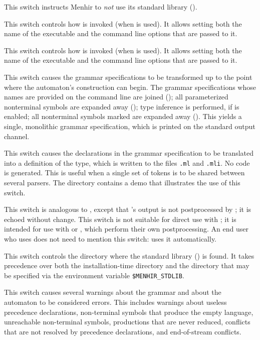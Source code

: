 \documentclass[onecolumn,11pt,nocopyrightspace,preprint]{sigplanconf}
\begin{document}
\docswitch{\onostdlib} This switch instructs Menhir to \emph{not} use
its standard library ().

 This switch controls how \ocamlc is
invoked (when \oinfer is used). It allows setting both the name of
the executable and the command line options that are passed to it.

 This switch controls how \ocamldep is
invoked (when \odepend is used). It allows setting both the name of the
executable and the command line options that are passed to it.

\docswitch{\oonlypreprocess} This switch causes the grammar specifications
to be transformed up to the point where the automaton's construction can
begin. The grammar specifications whose names are provided on the command line
are joined (); all parameterized nonterminal symbols are
expanded away (); type inference is performed, if \oinfer
is enabled; all nonterminal symbols marked \dinline are expanded away
(). This yields a single, monolithic grammar specification,
which is printed on the standard output channel.

\docswitch{\oonlytokens} This switch causes the \dtoken declarations in
the grammar specification to be translated into a definition of the \token
type, which is written to the files \texttt{.ml} and
\texttt{.mli}. No code is generated. This is useful when
a single set of tokens is to be shared between several parsers. The directory
 contains a demo that illustrates the use of this switch.

\docswitch{\orawdepend} This switch is analogous to \odepend, except that
\ocamldep's output is not postprocessed by \menhir; it is echoed without
change. This switch is not suitable for direct use with \make; it is
intended for use with \omake or \ocamlbuild, which perform their own
postprocessing.
An end user who uses \ocamlbuild does not need to mention this switch:
\ocamlbuild uses it automatically.

 This switch controls the directory where
the standard library () is found. It takes precedence over
both the installation-time directory and the directory that may be specified
via the environment variable \verb+$MENHIR_STDLIB+.

\docswitch{\ostrict} This switch causes several warnings about the grammar
and about the automaton to be considered errors. This includes warnings about
useless precedence declarations, non-terminal symbols that produce the empty
language, unreachable non-terminal symbols, productions that are never
reduced, conflicts that are not resolved by precedence declarations, and
end-of-stream conflicts.
\end{document}
